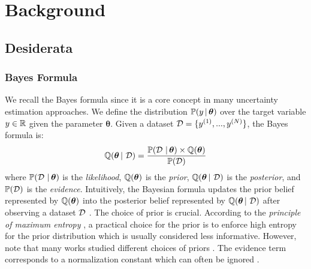 \chapter{Background}
\label{chap:background}

\section{Desiderata}

\subsection{Bayes Formula} We recall the Bayes formula since it is a core concept in many uncertainty estimation approaches.
We define the distribution $\mathbb{P}(y \,|\, \bm{\theta})$ over the target variable $y \in \operatorname{\mathbb{R}}$ given the parameter $\bm{\theta}$.
Given a dataset $\operatorname{\mathcal{D}}=\{y^{(1)}, ..., y^{(N)}\}$, the Bayes formula is:
\begin{equation}
    \operatorname{\mathbb{Q}}(\bm{\theta} \,|\, \operatorname{\mathcal{D}}) = \frac{\mathbb{P}(\operatorname{\mathcal{D}} \,|\, \bm{\theta}) \times \operatorname{\mathbb{Q}}(\bm{\theta})}{\mathbb{P}(\operatorname{\mathcal{D}})}
\end{equation}
where $\mathbb{P}(\operatorname{\mathcal{D}} \,|\, \bm{\theta})$ is the \emph{likelihood}, $\operatorname{\mathbb{Q}}(\bm{\theta})$ is the \emph{prior}, $\operatorname{\mathbb{Q}}(\bm{\theta} \,|\, \operatorname{\mathcal{D}})$ is the \emph{posterior}, and $\mathbb{P}(\operatorname{\mathcal{D}})$ is the \emph{evidence}.
Intuitively, the Bayesian formula updates the prior belief represented by $\operatorname{\mathbb{Q}}(\bm{\theta})$ into the posterior belief represented by $\operatorname{\mathbb{Q}}(\bm{\theta} \,|\, \operatorname{\mathcal{D}})$ after observing a dataset $\operatorname{\mathcal{D}}$ \cite{bishop}.
The choice of prior is crucial. According to the \emph{principle of maximum entropy} \citep{maximum-entropy-principle}, a practical choice for the prior is to enforce high entropy for the prior distribution which is usually considered less informative. However, note that many works studied different choices of priors \cite{jeffreys1946prior, silvestro2020prior}.
The evidence term corresponds to a normalization constant which can often be ignored \cite{bishop}.

